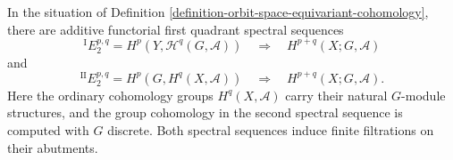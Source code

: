 \begin{lemma}
\label{lemma-orbit-space-equivariant-spectral-sequences}
\begin{reference}
\cite[Chapter V, \S 5.2, Theorem 5.2.1, pp. 200--201]{Tohoku}
\end{reference}
In the situation of Definition
\ref{definition-orbit-space-equivariant-cohomology}, there are additive
functorial first quadrant spectral sequences
\begin{equation}
\label{equation-orbit-space-equivariant-spectral-sequence-I}
{}^{\mathrm I}E_2^{p, q}
=
H^p(Y, \mathcal{H}^q(G, \mathcal{A}))
\quad\Longrightarrow\quad
H^{p + q}(X; G, \mathcal{A})
\end{equation}
and
\begin{equation}
\label{equation-orbit-space-equivariant-spectral-sequence-II}
{}^{\mathrm{II}}E_2^{p, q}
=
H^p(G, H^q(X, \mathcal{A}))
\quad\Longrightarrow\quad
H^{p + q}(X; G, \mathcal{A}).
\end{equation}
Here the ordinary cohomology groups $H^q(X, \mathcal{A})$ carry their
natural $G$-module structures, and the group cohomology in the second
spectral sequence is computed with $G$ discrete. Both spectral sequences
induce finite filtrations on their abutments.
\end{lemma}

